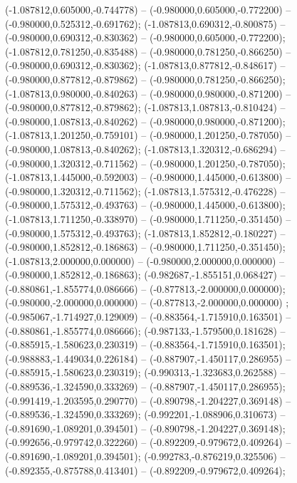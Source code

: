  (-1.087812,0.605000,-0.744778) -- (-0.980000,0.605000,-0.772200) -- (-0.980000,0.525312,-0.691762);
 (-1.087813,0.690312,-0.800875) -- (-0.980000,0.690312,-0.830362) -- (-0.980000,0.605000,-0.772200);
 (-1.087812,0.781250,-0.835488) -- (-0.980000,0.781250,-0.866250) -- (-0.980000,0.690312,-0.830362);
 (-1.087813,0.877812,-0.848617) -- (-0.980000,0.877812,-0.879862) -- (-0.980000,0.781250,-0.866250);
 (-1.087813,0.980000,-0.840263) -- (-0.980000,0.980000,-0.871200) -- (-0.980000,0.877812,-0.879862);
 (-1.087813,1.087813,-0.810424) -- (-0.980000,1.087813,-0.840262) -- (-0.980000,0.980000,-0.871200);
 (-1.087813,1.201250,-0.759101) -- (-0.980000,1.201250,-0.787050) -- (-0.980000,1.087813,-0.840262);
 (-1.087813,1.320312,-0.686294) -- (-0.980000,1.320312,-0.711562) -- (-0.980000,1.201250,-0.787050);
 (-1.087813,1.445000,-0.592003) -- (-0.980000,1.445000,-0.613800) -- (-0.980000,1.320312,-0.711562);
 (-1.087813,1.575312,-0.476228) -- (-0.980000,1.575312,-0.493763) -- (-0.980000,1.445000,-0.613800);
 (-1.087813,1.711250,-0.338970) -- (-0.980000,1.711250,-0.351450) -- (-0.980000,1.575312,-0.493763);
 (-1.087813,1.852812,-0.180227) -- (-0.980000,1.852812,-0.186863) -- (-0.980000,1.711250,-0.351450);
 (-1.087813,2.000000,0.000000) -- (-0.980000,2.000000,0.000000) -- (-0.980000,1.852812,-0.186863);
 (-0.982687,-1.855151,0.068427) -- (-0.880861,-1.855774,0.086666) -- (-0.877813,-2.000000,0.000000);
 (-0.980000,-2.000000,0.000000) -- (-0.877813,-2.000000,0.000000) ;
 (-0.985067,-1.714927,0.129009) -- (-0.883564,-1.715910,0.163501) -- (-0.880861,-1.855774,0.086666);
 (-0.987133,-1.579500,0.181628) -- (-0.885915,-1.580623,0.230319) -- (-0.883564,-1.715910,0.163501);
 (-0.988883,-1.449034,0.226184) -- (-0.887907,-1.450117,0.286955) -- (-0.885915,-1.580623,0.230319);
 (-0.990313,-1.323683,0.262588) -- (-0.889536,-1.324590,0.333269) -- (-0.887907,-1.450117,0.286955);
 (-0.991419,-1.203595,0.290770) -- (-0.890798,-1.204227,0.369148) -- (-0.889536,-1.324590,0.333269);
 (-0.992201,-1.088906,0.310673) -- (-0.891690,-1.089201,0.394501) -- (-0.890798,-1.204227,0.369148);
 (-0.992656,-0.979742,0.322260) -- (-0.892209,-0.979672,0.409264) -- (-0.891690,-1.089201,0.394501);
 (-0.992783,-0.876219,0.325506) -- (-0.892355,-0.875788,0.413401) -- (-0.892209,-0.979672,0.409264);
